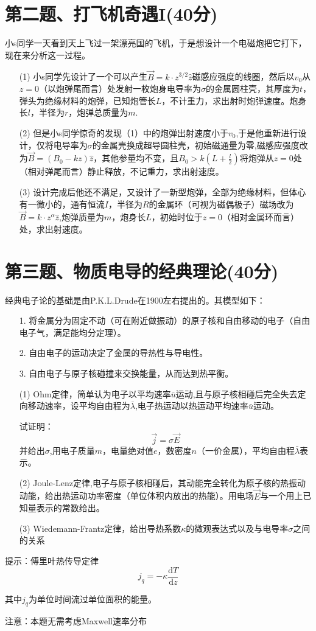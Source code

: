 \documentclass{article}
\begin{document}
\section*{第二题、打飞机奇遇I(40分)}
小s同学一天看到天上飞过一架漂亮国的飞机，于是想设计一个电磁炮把它打下，现在来分析这一过程。
\begin{itemize}
\item[(1)]小s同学先设计了一个可以产生$\vec{B}=k\cdot z^{3/2}\hat{z}$磁感应强度的线圈，然后以$v_0$从$z=0$（以炮弹尾而言）处发射一枚炮身电导率为$\sigma$的金属圆柱壳，其厚度为$t$，弹头为绝缘材料的炮弹，已知炮管长$L$，不计重力，求出射时炮弹速度。炮身长$l$，半径为$r$，炮弹总质量为$m$.
\item[(2)]但是小s同学惊奇的发现（1）中的炮弹出射速度小于$v_0$,于是他重新进行设计，仅将电导率为$\sigma$的金属壳换成超导圆柱壳，初始磁通量为零,磁感应强度改为$\vec{B}=(B_0-kz)\hat{z}$，其他参量均不变，且$B_0>k(L+\frac{l}{2})$将炮弹从$z=0$处（相对弹尾而言）静止释放，不记重力，求出射速度。
\item[(3)]设计完成后他还不满足，又设计了一新型炮弹，全部为绝缘材料，但体心有一微小的，通有恒流$I$，半径为$R$的金属环（可视为磁偶极子）磁场改为$\vec{B}=k\cdot z^{\alpha}\hat{z}$,炮弹质量为$m$，炮身长$L$，初始时位于$z=0$（相对金属环而言）处，求出射速度。
\end{itemize}

\section*{第三题、物质电导的经典理论(40分)}
经典电子论的基础是由P.K.L.Drude在1900左右提出的。其模型如下：
\begin{itemize}
\item[1.]将金属分为固定不动（可在附近做振动）的原子核和自由移动的电子（自由电子气，满足能均分定理）。
\item[2.]自由电子的运动决定了金属的导热性与导电性。
\item[3.]自由电子与原子核碰撞来交换能量，从而达到热平衡。
\end{itemize}
\begin{itemize}
\item[(1)]Ohm定律，简单认为电子以平均速率$\bar{u}$运动,且与原子核相碰后完全失去定向移动速率，设平均自由程为$\bar{\lambda}$,电子热运动以热运动平均速率$\bar{u}$运动。\par
试证明：
\[
\vec{j}=\sigma\vec{E}
\]
并给出$\sigma$,用电子质量$m$，电量绝对值$e$，数密度$n$（一价金属），平均自由程$\bar{\lambda}$表示。
\item[(2)]Joule-Lenz定律,电子与原子核相碰后，其动能完全转化为原子核的热振动动能，给出热运动功率密度（单位体积内放出的热能）。用电场$\vec{E}$与一个用上已知量表示的常数给出。
\item[(3)]Wiedemann-Frantz定律，给出导热系数$\kappa$的微观表达式以及与电导率$\sigma$之间的关系
\end{itemize}
\par
提示：傅里叶热传导定律
\[
j_q=-\kappa\dfrac{\mathrm{d}T}{\mathrm{d}z}
\]\par
其中$j_q$为单位时间流过单位面积的能量。\par
注意：本题无需考虑Maxwell速率分布
\end{document}
